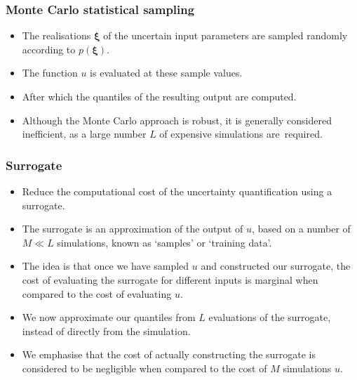 \documentclass[11pt,ucs]{beamer}
\begin{document}
\begin{frame}\frametitle{Monte Carlo statistical sampling}

\begin{itemize}
\item The realisations $\boldsymbol{\xi}$ of the uncertain input parameters are sampled randomly according to $p(\boldsymbol{\xi})$.

\item The function $u$ is evaluated at these sample values. 

\item After which the quantiles of the resulting output are computed. 

\item Although the Monte Carlo approach is robust, it is generally considered inefficient, as a large number $L$ of expensive simulations \mbox{are required}.

\end{itemize}

\end{frame}

\begin{frame}\frametitle{Surrogate}

\begin{itemize}
\item Reduce the computational cost of the uncertainty quantification using a surrogate. %

\item The surrogate is an approximation of the output of $u$, based on a number of $M \ll L$ simulations, known as `samples' or `training data'. 

\item The idea is that once we have sampled $u$ and constructed our surrogate, the cost of evaluating the surrogate for different inputs is marginal when compared to the cost of evaluating $u$. 

\item We now approximate our quantiles from $L$ evaluations of the surrogate, instead of directly from the simulation.  

\item We emphasise that the cost of actually constructing the surrogate is considered to be negligible when compared to the cost of $M$ simulations $u$.

\end{itemize}

\end{frame}
\end{document}
